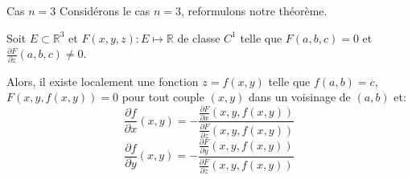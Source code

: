 \documentclass[a4paper]{article}
\begin{document}
\begin{parag}{Cas $n = 3$}
    Considérons le cas $n = 3$, reformulons notre théorème.

    Soit $E \subset \mathbb{R}^3$ et $F\left(x, y, z\right) : E \mapsto \mathbb{R}$ de classe $C^1$ telle que $F\left(a, b, c\right) = 0$ et $\frac{\partial F}{\partial z}\left(a, b, c\right) \neq 0$.

    Alors, il existe localement une fonction $z = f\left(x, y\right)$ telle que $f\left(a, b\right) = c$, $F\left(x, y, f\left(x, y\right)\right) = 0$ pour tout couple $\left(x, y\right)$ dans un voisinage de $\left(a, b\right)$ et:
    \[\frac{\partial f}{\partial x}\left(x, y\right) = -\frac{\frac{\partial F}{\partial x}\left(x, y, f\left(x, y\right)\right)}{\frac{\partial F}{\partial z}\left(x, y, f\left(x, y\right)\right)}\]
    \[\frac{\partial f}{\partial y}\left(x, y\right) = -\frac{\frac{\partial F}{\partial y}\left(x, y, f\left(x, y\right)\right)}{\frac{\partial F}{\partial z}\left(x, y, f\left(x, y\right)\right)}\]
\end{parag}
\end{document}
